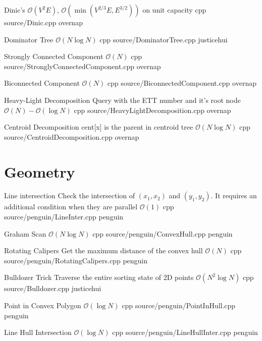 \documentclass[landscape, 10pt, a4paper, oneside, twocolumn]{extarticle}
\begin{document}

\Algorithm
{Dinic's}
{}
{$\mathcal{O}(V^2E)$, $\mathcal{O}(\min{(V^{2/3}E,E^{3/2})})$ on unit capacity}
{cpp}
{source/Dinic.cpp}
{overnap}

\Algorithm
{Dominator Tree}
{}
{$\mathcal{O}(N\log{N})$}
{cpp}
{source/DominatorTree.cpp}
{justicehui}

\Algorithm
{Strongly Connected Component}
{}
{$\mathcal{O}(N)$}
{cpp}
{source/StronglyConnectedComponent.cpp}
{overnap}

\Algorithm
{Biconnected Component}
{}
{$\mathcal{O}(N)$}
{cpp}
{source/BiconnectedComponent.cpp}
{overnap}


\Algorithm
{Heavy-Light Decomposition}
{Query with the ETT number and it's root node}
{$\mathcal{O}(N)-\mathcal{O}(\log{N})$}
{cpp}
{source/HeavyLightDecomposition.cpp}
{overnap}

\Algorithm
{Centroid Decomposition}
{cent[x] is the parent in centroid tree}
{$\mathcal{O}(N\log{N})$}
{cpp}
{source/CentroidDecomposition.cpp}
{overnap}


\section{Geometry}

\Algorithm
{Line intersection}
{Check the intersection of $(x_1, x_2)$ and $(y_1, y_2)$. It requires an additional condition when they are parallel}
{$\mathcal{O}(1)$}
{cpp}
{source/penguin/LineInter.cpp}
{penguin}

\Algorithm
{Graham Scan}
{}
{$\mathcal{O}(N\log{N})$}
{cpp}
{source/penguin/ConvexHull.cpp}
{penguin}

\Algorithm
{Rotating Calipers}
{Get the maximum distance of the convex hull}
{$\mathcal{O}(N)$}
{cpp}
{source/penguin/RotatingCalipers.cpp}
{penguin}

\Algorithm
{Bulldozer Trick}
{Traverse the entire sorting state of 2D points}
{$\mathcal{O}(N^2\log{N})$}
{cpp}
{source/Bulldozer.cpp}
{justicehui}

\Algorithm
{Point in Convex Polygon}
{}
{$\mathcal{O}(\log{N})$}
{cpp}
{source/penguin/PointInHull.cpp}
{penguin}

\Algorithm
{Line Hull Intersection}
{}
{$\mathcal{O}(\log{N})$}
{cpp}
{source/penguin/LineHullInter.cpp}
{penguin}
\end{document}
